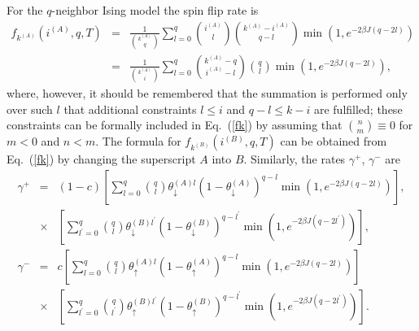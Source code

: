 \documentclass[11pt]{article}
\begin{document}
For the $q$-neighbor Ising model the spin flip rate is 
\begin{eqnarray}
f_{k^{(A)}}\left( i^{(A)},q,T\right) &=& \frac{1}{{k^{(A)} \choose q}} \sum_{l=0}^{q} {i^{(A)} \choose l} 
{k^{(A)}-i^{(A)} \choose q-l} \min \left(1, e^{ -2\beta J(q-2l)}\right)
\nonumber\\
&=&  \frac{1}{{k^{(A)} \choose i}} \sum_{l=0}^{q} {k^{(A)}-q \choose i^{(A)}-l} {q \choose l}
\min \left(1, e^{ -2\beta J(q-2l)}\right),
\label{fk}
\end{eqnarray}
where, however, it should be remembered that the summation is performed only over such $l$ that additional constraints
$l\le i$ and $q-l \le k-i$ are fulfilled; these constraints can be formally included in Eq.\  (\ref{fk}) by assuming that 
${n \choose m}\equiv 0$ for $m<0$ and $n<m$. The formula for $f_{k^{(B)}}\left( i^{(B)},q,T\right)$ 
can be obtained from Eq.\ (\ref{fk}) by changing the superscript $A$ into $B$. Similarly, the rates
$\gamma^{+}$, $\gamma^{-}$ are
\begin{eqnarray}
\gamma^{+} &=& (1-c) 
\left[ \sum_{l=0}^{q} {q\choose l} \theta^{(A)l}_{\downarrow} \left( 1-\theta^{(A)}_{\downarrow} \right)^{q-l}
 \min \left(1, e^{ -2\beta J(q-2l)}\right) \right], \nonumber\\
&\times& 
\left[ \sum_{l^{\prime}=0}^{q} {q\choose l} \theta^{(B)l^{\prime}}_{\downarrow} 
\left( 1-\theta^{(B)}_{\downarrow} \right)^{q-l^{\prime}}
 \min \left(1, e^{ -2\beta J(q-2l^{\prime})}\right) \right], \label{gammaplus}\\
\gamma^{-} &=& c\left[ \sum_{l=0}^{q} {q\choose l} \theta_{\uparrow}^{(A)l} \left( 1-\theta_{\uparrow}^{(A)} \right)^{q-l}
 \min \left(1, e^{ -2\beta J(q-2l)}\right) \right] \nonumber\\
&\times&
\left[ \sum_{l^{\prime}=0}^{q} {q\choose l^{\prime}} \theta_{\uparrow}^{(B)l^{\prime}} 
\left( 1-\theta_{\uparrow}^{(B)} \right)^{q-l^{\prime}}
 \min \left(1, e^{ -2\beta J(q-2l^{\prime})}\right) \right]. \label{gammaminus}
\end{eqnarray}
\end{document}
